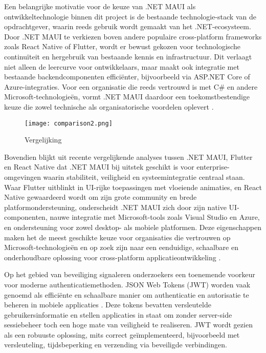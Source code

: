 Een belangrijke motivatie voor de keuze van .NET MAUI als ontwikkeltechnologie binnen dit project is de bestaande technologie-stack van de opdrachtgever, waarin reeds gebruik wordt gemaakt van het .NET-ecosysteem. Door .NET MAUI te verkiezen boven andere populaire cross-platform frameworks zoals React Native of Flutter, wordt er bewust gekozen voor technologische continuïteit en hergebruik van bestaande kennis en infrastructuur. Dit verlaagt niet alleen de leercurve voor ontwikkelaars, maar maakt ook integratie met bestaande backendcomponenten efficiënter, bijvoorbeeld via ASP.NET Core of Azure-integraties. Voor een organisatie die reeds vertrouwd is met C# en andere Microsoft-technologieën, vormt .NET MAUI daardoor een toekomstbestendige keuze die zowel technische als organisatorische voordelen oplevert \autocite{Longe2025}.

\begin{figure}
    \centering
    \texttt{[image: comparison2.png]}
    \caption[Vergelijking]{Vergelijking}
\end{figure}

Bovendien blijkt uit recente vergelijkende analyses tussen .NET MAUI, Flutter en React Native dat .NET MAUI bij uitstek geschikt is voor enterprise-omgevingen waarin stabiliteit, veiligheid en systeemintegratie centraal staan. Waar Flutter uitblinkt in UI-rijke toepassingen met vloeiende animaties, en React Native gewaardeerd wordt om zijn grote community en brede platformondersteuning, onderscheidt .NET MAUI zich door zijn native UI-componenten, nauwe integratie met Microsoft-tools zoals Visual Studio en Azure, en ondersteuning voor zowel desktop- als mobiele platformen. Deze eigenschappen maken het de meest geschikte keuze voor organisaties die vertrouwen op Microsoft-technologieën en op zoek zijn naar een eenduidige, schaalbare en onderhoudbare oplossing voor cross-platform applicatieontwikkeling \autocite{Gajjam2025}.

Op het gebied van beveiliging signaleren onderzoekers een toenemende voorkeur voor moderne authenticatiemethoden. JSON Web Tokens (JWT) worden vaak genoemd als efficiënte en schaalbare manier om authenticatie en autorisatie te beheren in mobiele applicaties \autocite{Gao2023}. Deze tokens bevatten versleutelde gebruikersinformatie en stellen applicaties in staat om zonder server-side sessiebeheer toch een hoge mate van veiligheid te realiseren. JWT wordt gezien als een robuuste oplossing, mits correct geïmplementeerd, bijvoorbeeld met versleuteling, tijdsbeperking en verzending via beveiligde verbindingen.

